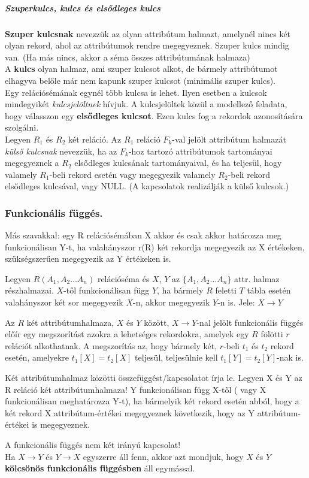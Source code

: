\subparagraph{Szuperkulcs, kulcs és elsődleges kulcs} 
\textbf{Szuper kulcsnak} nevezzük az olyan attribútum halmazt, amelynél nincs két olyan rekord, ahol az attribútumok rendre megegyeznek. Szuper kulcs mindig van. (Ha más nincs, akkor a séma összes attribútumának halmaza)\\
A \textbf{kulcs} olyan halmaz, ami szuper kulcsot alkot, de bármely attribútumot elhagyva belőle már nem kapunk szuper kulcsot (minimális szuper kulcs).\\
Egy relációsémának egynél több kulcsa is lehet. Ilyen esetben a kulcsok mindegyikét \emph{kulcsjelöltnek} hívjuk. A kulcsjelöltek közül a modellező feladata, hogy válasszon egy \textbf{elsődleges kulcsot}. Ezen kulcs fog a rekordok azonosítására szolgálni.\\
Legyen $R_1$ és $R_2$ két reláció. Az $R_1$ reláció $F_k$-val jelölt attribútum halmazát \emph{külső kulcsnak} nevezzük, ha az $F_k$-hoz tartozó attribútumok tartományai megegyeznek a $R_2$ elsődleges kulcsának tartományaival, és ha teljesül, hogy valamely $R_1$-beli rekord esetén vagy megegyezik valamely $R_2$-beli rekord elsődleges kulcsával, vagy NULL. (A kapcsolatok realizálják a külső kulcsok.)

\subsubsection{Funkcionális függés.}
Más szavakkal: egy R relációsémában X akkor és csak akkor
határozza meg funkcionálisan Y-t, ha valahányszor r(R) két
rekordja megegyezik az X értékeken, szükségszerűen
megegyezik az Y értékeken is.
\begin{definition}[1]
	Legyen $R(A_1 , A_2 \dots A_n)$ relációséma és $X$, $Y$ az $\{A_1 , A_2 \dots A_n\}$ attr. halmaz részhalmazai. $X$-től funkcionálisan függ $Y$, ha bármely $R$ feletti $T$ tábla esetén valahányszor két sor megegyezik $X$-n, akkor megegyezik $Y$-n is. Jele: $X \to Y$
\end{definition}
\begin{definition}[2]
	Az $R$ két attribútumhalmaza, $X$ és $Y$ között, $X \to Y$-nal jelölt funkcionális függés előír egy megszorítást azokra a lehetséges rekordokra, amelyek egy $R$ fölötti $r$ relációt alkothatnak. A megszorítás az, hogy bármely két, $r$-beli $t_1$ és $t_2$ rekord esetén, amelyekre $t_1[X] = t_2[X]$ teljesül, teljesülnie kell $t_1[Y] = t_2[Y]$-nak is.
\end{definition}
\begin{note}
	Két attribútumhalmaz közötti összefüggést/kapcsolatot írja le. Legyen X és Y az R reláció két attribútumhalmaza! Y funkcionálisan függ X-től ( vagy X funkcionálisan meghatározza Y-t), ha bármelyik két rekord esetén abból, hogy a két rekord X attribútum-értékei megegyeznek következik, hogy az Y attribútum-értékei is megegyeznek.
\end{note}
\begin{note}
	A funkcionális függés nem két irányú kapcsolat!\\
	Ha $X \to Y$ és $Y \to X$ egyszerre áll fenn, akkor azt mondjuk, hogy $X$ és $Y$ \textbf{kölcsönös funkcionális függésben} áll egymással.
\end{note}


